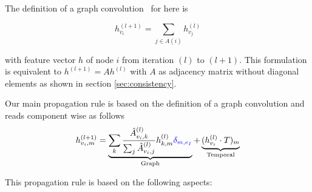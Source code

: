 \documentclass[]{article}
\begin{document}
The definition of a graph convolution~\cite{Kipf2017SemiSupervisedCW} for here is

\begin{equation}
	h_{v_i}^{(l+1)} = \sum_{j\in A(i)} h_{v_j}^{(l)}
\end{equation}

with feature vector $h$ of node $i$ from iteration $(l)$ to $(l+1)$. This formulation is equivalent to $h^{(l+1)} = A h^{(l)}$ with $A$ as adjacency matrix without diagonal elements as shown in section \ref{sec:consistency}.

Our main propagation rule is based on the definition of a graph convolution and reads component wise as follows
\begin{equation}
	h_{v_i, m}^{(l+1)}
	=
	\underbrace{
		\sum_k \frac{\hat{A}_{v_i, k}^{(l)}}{\sum_j \hat{A}_{v_i, j}^{(l)}} h_{k, m}^{(l)} \textcolor{blue}{\delta_{m, e_I}}
	}_{\text{Graph}}
	+
	\underbrace{
		(h_{v_i}^{(l)}\cdot T)_m
	}_{\text{Temporal}}
\end{equation}

This propagation rule is based on the following aspects:
\end{document}
